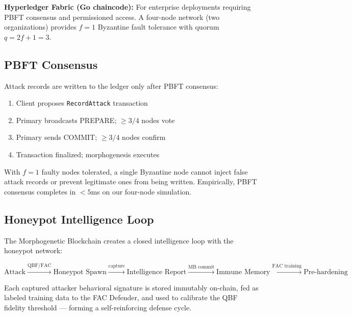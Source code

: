 \textbf{Hyperledger Fabric (Go chaincode):} For enterprise deployments requiring
PBFT consensus and permissioned access. A four-node network (two organizations)
provides $f=1$ Byzantine fault tolerance with quorum $q = 2f+1 = 3$.

\subsection{PBFT Consensus}

Attack records are written to the ledger only after PBFT consensus:

\begin{enumerate}
  \item Client proposes \texttt{RecordAttack} transaction
  \item Primary broadcasts PREPARE; $\geq 3/4$ nodes vote
  \item Primary sends COMMIT; $\geq 3/4$ nodes confirm
  \item Transaction finalized; morphogenesis executes
\end{enumerate}

With $f=1$ faulty nodes tolerated, a single Byzantine node cannot inject
false attack records or prevent legitimate ones from being written.
Empirically, PBFT consensus completes in $<5$ms on our four-node simulation.

\subsection{Honeypot Intelligence Loop}

The Morphogenetic Blockchain creates a closed intelligence loop with the
honeypot network:

\[
\text{Attack} \xrightarrow{\text{QBF/FAC}} \text{Honeypot Spawn}
\xrightarrow{\text{capture}} \text{Intelligence Report}
\xrightarrow{\text{MB commit}} \text{Immune Memory}
\xrightarrow{\text{FAC training}} \text{Pre-hardening}
\]

Each captured attacker behavioral signature is stored immutably on-chain,
fed as labeled training data to the FAC Defender, and used to calibrate
the QBF fidelity threshold — forming a self-reinforcing defense cycle.
